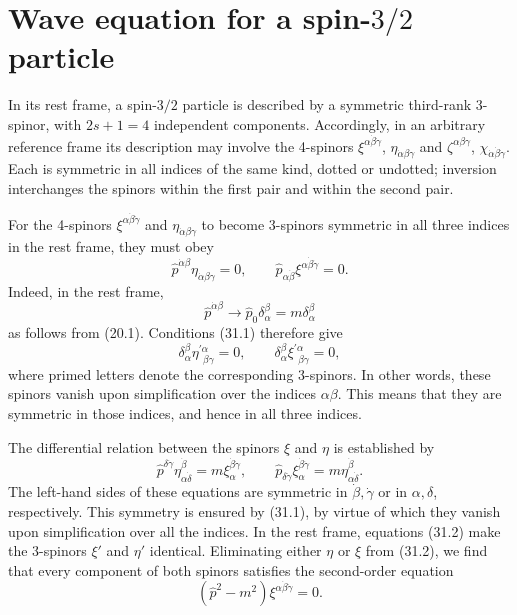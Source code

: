 
\section{Wave equation for a spin-\texorpdfstring{$3/2$}{3/2} particle}

In its rest frame, a spin-$3/2$ particle is described by a symmetric third-rank 3-spinor, with $2s+1=4$ independent components. Accordingly, in an arbitrary reference frame its description may involve the 4-spinors $\xi^{\alpha\dot\beta\dot\gamma}$, $\eta_{\dot\alpha\beta\gamma}$ and $\zeta^{\alpha\beta\gamma}$, $\chi_{\dot\alpha\dot\beta\dot\gamma}$. Each is symmetric in all indices of the same kind, dotted or undotted; inversion interchanges the spinors within the first pair and within the second pair.

For the 4-spinors $\xi^{\alpha\dot\beta\dot\gamma}$ and $\eta_{\dot\alpha\beta\gamma}$ to become 3-spinors symmetric in all three indices in the rest frame, they must obey
\begin{equation}
\widehat p^{\dot\alpha\beta}\eta_{\dot\alpha\beta\gamma}=0,
\qquad
\widehat p_{\alpha\dot\beta}\xi^{\alpha\dot\beta\dot\gamma}=0.
\tag{31.1}
\end{equation}
Indeed, in the rest frame,
\[
\widehat p^{\dot\alpha\beta}\to\widehat p_0\delta_\alpha^\beta
=m\delta_\alpha^\beta
\]
as follows from (20.1). Conditions (31.1) therefore give
\[
\delta_\alpha^\beta\eta^{\prime\alpha}_{\ \ \beta\gamma}=0,
\qquad
\delta_\alpha^\beta\xi^{\prime\alpha}_{\ \ \beta\gamma}=0,
\]
where primed letters denote the corresponding 3-spinors. In other words, these spinors vanish upon simplification over the indices $\alpha\beta$. This means that they are symmetric in those indices, and hence in all three indices.

The differential relation between the spinors $\xi$ and $\eta$ is established by
\begin{equation}
\widehat p^{\delta\dot\gamma}\eta^{\dot\beta}_{\alpha\dot\delta}
=m\xi^{\dot\beta\dot\gamma}_\alpha,
\qquad
\widehat p_{\delta\dot\gamma}\xi^{\dot\beta\dot\gamma}_\alpha
=m\eta^{\dot\beta}_{\alpha\dot\delta}.
\tag{31.2}
\end{equation}
The left-hand sides of these equations are symmetric in $\dot\beta,\dot\gamma$ or in $\alpha,\delta$, respectively. This symmetry is ensured by (31.1), by virtue of which they vanish upon simplification over all the indices. In the rest frame, equations (31.2) make the 3-spinors $\xi'$ and $\eta'$ identical. Eliminating either $\eta$ or $\xi$ from (31.2), we find that every component of both spinors satisfies the second-order equation
\begin{equation}
(\widehat p^2-m^2)\xi^{\alpha\dot\beta\dot\gamma}=0.
\tag{31.3}
\end{equation}

